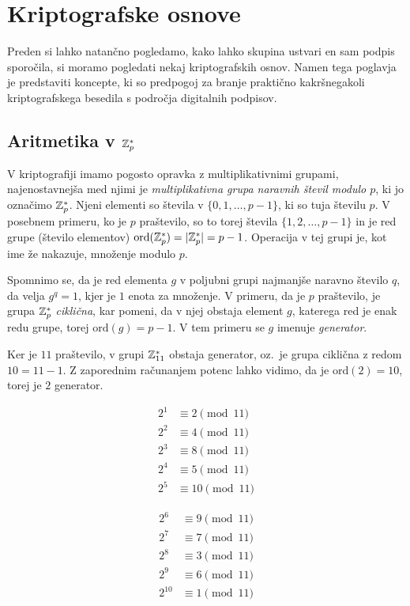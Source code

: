 \section{Kriptografske osnove}
\label{sec:osnove}
Preden si lahko natančno pogledamo, kako lahko skupina ustvari en sam podpis sporočila, si moramo 
pogledati nekaj kriptografskih osnov. Namen tega poglavja je predstaviti koncepte, ki so predpogoj za
branje praktično kakršnegakoli kriptografskega besedila s področja digitalnih podpisov.

\subsection{Aritmetika v \texorpdfstring{$\mathbb Z_p^*$}{Zp∗}}
V kriptografiji imamo pogosto opravka z multiplikativnimi grupami, najenostavnejša med njimi je
\textit{multiplikativna grupa naravnih števil modulo $p$}, ki jo označimo $\mathbb Z_p^*$. Njeni elementi
so števila v $\{0, 1, \dots, p - 1\}$, ki so tuja številu $p$. V posebnem primeru, ko je $p$ praštevilo,
so to torej števila $\{1, 2, \dots, p - 1\}$ in je red grupe (število elementov) $\text{ord}(\mathbb Z_p^*)
= |\mathbb Z_p^*| = p - 1$. Operacija v tej grupi je, kot ime že nakazuje, množenje modulo $p$.

Spomnimo se, da je red elementa $g$ v poljubni grupi najmanjše naravno število $q$, da velja $g^q = 1$,
kjer je $1$ enota za množenje. V primeru, da je $p$ praštevilo, je grupa $\mathbb Z_p^*$ \textit{ciklična},
kar pomeni, da v njej obstaja element $g$, katerega red je enak redu grupe, torej $\text{ord}(g) = p - 1$.
V tem primeru se $g$ imenuje \textit{generator}.

\begin{primer}[Grupa $\Z_{11}^*$]
\label{primer:Z11}
Ker je $11$ praštevilo, v grupi $\Z_{11}^*$ obstaja generator, oz.\ je grupa ciklična z redom $10 = 
11 - 1$. Z zaporednim računanjem potenc lahko vidimo, da je $\text{ord}(2) = 10$, torej je $2$ 
generator.

\begin{minipage}{0.45\textwidth}
    \begin{align*}
        2^1 &\equiv 2 \pmod{11} \\
        2^2 &\equiv 4 \pmod{11} \\
        2^3 &\equiv 8 \pmod{11} \\
        2^4 &\equiv 5 \pmod{11} \\
        2^5 &\equiv 10 \pmod{11} 
    \end{align*}
\end{minipage}
\begin{minipage}{0.45\textwidth}
    \begin{align*}
        2^6 &\equiv 9 \pmod{11} \\
        2^7 &\equiv 7 \pmod{11} \\
        2^8 &\equiv 3 \pmod{11} \\
        2^9 &\equiv 6 \pmod{11} \\
        2^{10} &\equiv 1 \pmod{11} 
    \end{align*}
\end{minipage}

\end{primer}

